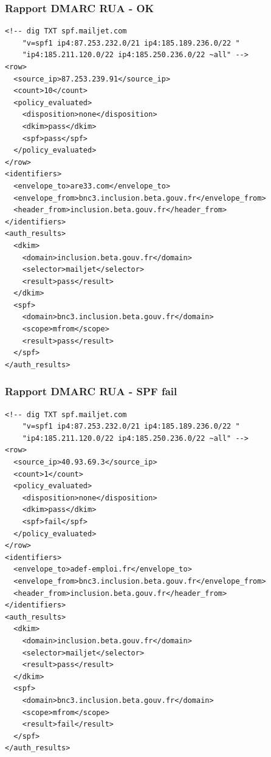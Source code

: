 \documentclass{beamer}
\begin{document}
\begin{frame}[fragile]
    \frametitle{Rapport DMARC RUA - OK}
    \begin{verbatim}
<!-- dig TXT spf.mailjet.com
    "v=spf1 ip4:87.253.232.0/21 ip4:185.189.236.0/22 "
    "ip4:185.211.120.0/22 ip4:185.250.236.0/22 ~all" -->
<row>
  <source_ip>87.253.239.91</source_ip>
  <count>10</count>
  <policy_evaluated>
    <disposition>none</disposition>
    <dkim>pass</dkim>
    <spf>pass</spf>
  </policy_evaluated>
</row>
<identifiers>
  <envelope_to>are33.com</envelope_to>
  <envelope_from>bnc3.inclusion.beta.gouv.fr</envelope_from>
  <header_from>inclusion.beta.gouv.fr</header_from>
</identifiers>
<auth_results>
  <dkim>
    <domain>inclusion.beta.gouv.fr</domain>
    <selector>mailjet</selector>
    <result>pass</result>
  </dkim>
  <spf>
    <domain>bnc3.inclusion.beta.gouv.fr</domain>
    <scope>mfrom</scope>
    <result>pass</result>
  </spf>
</auth_results>
    \end{verbatim}
\end{frame}

\begin{frame}[fragile]
    \frametitle{Rapport DMARC RUA - SPF fail}
    \begin{verbatim}
<!-- dig TXT spf.mailjet.com
    "v=spf1 ip4:87.253.232.0/21 ip4:185.189.236.0/22 "
    "ip4:185.211.120.0/22 ip4:185.250.236.0/22 ~all" -->
<row>
  <source_ip>40.93.69.3</source_ip>
  <count>1</count>
  <policy_evaluated>
    <disposition>none</disposition>
    <dkim>pass</dkim>
    <spf>fail</spf>
  </policy_evaluated>
</row>
<identifiers>
  <envelope_to>adef-emploi.fr</envelope_to>
  <envelope_from>bnc3.inclusion.beta.gouv.fr</envelope_from>
  <header_from>inclusion.beta.gouv.fr</header_from>
</identifiers>
<auth_results>
  <dkim>
    <domain>inclusion.beta.gouv.fr</domain>
    <selector>mailjet</selector>
    <result>pass</result>
  </dkim>
  <spf>
    <domain>bnc3.inclusion.beta.gouv.fr</domain>
    <scope>mfrom</scope>
    <result>fail</result>
  </spf>
</auth_results>
    \end{verbatim}
\end{frame}
\end{document}
